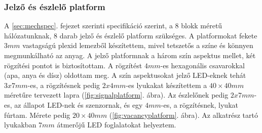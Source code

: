 \documentclass[a4paper,12pt]{article}
\begin{document}
\subsubsection{Jelző és észlelő platform}
A \ref{sec:mechspec}. fejezet szerinti specifikáció szerint, a 8 blokk méretű hálózatunknak, 8 darab jelző és észlelő platform szükséges.
A platformokat fekete $3mm$ vastagságú plexid lemezből készítettem, mivel tetszetős a színe és könnyen megmunkálható az anyag.
A jelző platformnak a három szín aspektus mellet, két rögzítési pontot is biztosítottam.
A rögzítést $4mm$-es hexagonális csavarokkal (apa, anya és dísz) oldottam meg.
A szín aspektusokat jelző LED-eknek tehát $3x7mm$-es, a rögzítésnek pedig $2x4mm$-es lyukakat készítettem a $40\times40mm$ méretűre tervezett lapra (\ref{fig:signalplatform}. ábra).
Az észlelőnek pedig $2x7mm$-es, az állapot LED-nek és szenzornak, és egy $4mm$-es, a rögzítésnek, lyukat fúrtam. Mérete pedig $20\times40mm$ (\ref{fig:vacancyplatform}. ábra).
Az alkatrész tartó lyukakban $7mm$ átmerőjű LED foglalatokat helyeztem.
\end{document}
